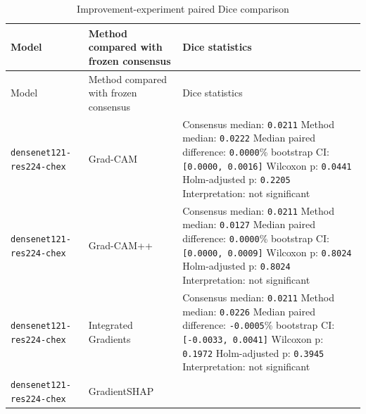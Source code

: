 \begingroup
\setlength{\tabcolsep}{4pt}
\renewcommand{\arraystretch}{1.15}
\begin{longtable}[]{@{}
		>{\raggedright\arraybackslash}p{}
		>{\raggedright\arraybackslash}p{}
		>{\raggedright\arraybackslash}p{}
		@{}}
	\caption{Improvement-experiment paired Dice comparison}\label{table:4-6}\tabularnewline
	\toprule
	Model & Method compared with frozen consensus & Dice statistics\tabularnewline
	\midrule
	\endfirsthead
	\toprule
	Model & Method compared with frozen consensus & Dice statistics\tabularnewline
	\midrule
	\endhead
	\texttt{densenet121-\allowbreak res224-\allowbreak chex} & Grad-CAM &
	Consensus median: \texttt{0.0211}\newline
	Method median: \texttt{0.0222}\newline
	Median paired difference: \texttt{0.0000}\newline
	95\% bootstrap CI: \texttt{[0.0000, 0.0016]}\newline
	Wilcoxon p: \texttt{0.0441}\newline
	Holm-adjusted p: \texttt{0.2205}\newline
	Interpretation: not significant\tabularnewline
	\midrule
	\texttt{densenet121-\allowbreak res224-\allowbreak chex} & Grad-CAM++ &
	Consensus median: \texttt{0.0211}\newline
	Method median: \texttt{0.0127}\newline
	Median paired difference: \texttt{0.0000}\newline
	95\% bootstrap CI: \texttt{[0.0000, 0.0009]}\newline
	Wilcoxon p: \texttt{0.8024}\newline
	Holm-adjusted p: \texttt{0.8024}\newline
	Interpretation: not significant\tabularnewline
	\midrule
	\texttt{densenet121-\allowbreak res224-\allowbreak chex} & Integrated Gradients &
	Consensus median: \texttt{0.0211}\newline
	Method median: \texttt{0.0226}\newline
	Median paired difference: \texttt{-0.0005}\newline
	95\% bootstrap CI: \texttt{[-0.0033, 0.0041]}\newline
	Wilcoxon p: \texttt{0.1972}\newline
	Holm-adjusted p: \texttt{0.3945}\newline
	Interpretation: not significant\tabularnewline
	\midrule
	\texttt{densenet121-\allowbreak res224-\allowbreak chex} & GradientSHAP &

\end{longtable}
